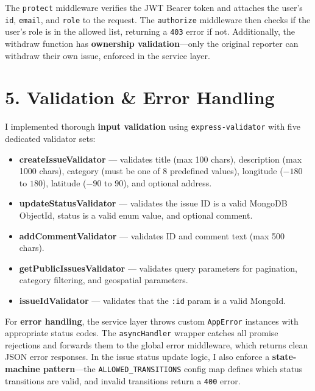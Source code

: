 \documentclass[12pt,a4paper]{article}
\begin{document}
The \texttt{protect} middleware verifies the JWT Bearer token and attaches the user's \texttt{id}, \texttt{email}, and \texttt{role} to the request. The \texttt{authorize} middleware then checks if the user's role is in the allowed list, returning a \texttt{403} error if not. Additionally, the withdraw function has \textbf{ownership validation}---only the original reporter can withdraw their own issue, enforced in the service layer.

\section{5. Validation \& Error Handling}

I implemented thorough \textbf{input validation} using \texttt{express-validator} with five dedicated validator sets:

\begin{itemize}[nosep]
    \item \textbf{createIssueValidator} --- validates title (max 100 chars), description (max 1000 chars), category (must be one of 8 predefined values), longitude ($-180$ to $180$), latitude ($-90$ to $90$), and optional address.
    \item \textbf{updateStatusValidator} --- validates the issue ID is a valid MongoDB ObjectId, status is a valid enum value, and optional comment.
    \item \textbf{addCommentValidator} --- validates ID and comment text (max 500 chars).
    \item \textbf{getPublicIssuesValidator} --- validates query parameters for pagination, category filtering, and geospatial parameters.
    \item \textbf{issueIdValidator} --- validates that the \texttt{:id} param is a valid MongoId.
\end{itemize}

For \textbf{error handling}, the service layer throws custom \texttt{AppError} instances with appropriate status codes. The \texttt{asyncHandler} wrapper catches all promise rejections and forwards them to the global error middleware, which returns clean JSON error responses. In the issue status update logic, I also enforce a \textbf{state-machine pattern}---the \texttt{ALLOWED\_TRANSITIONS} config map defines which status transitions are valid, and invalid transitions return a \texttt{400} error.

\end{document}
